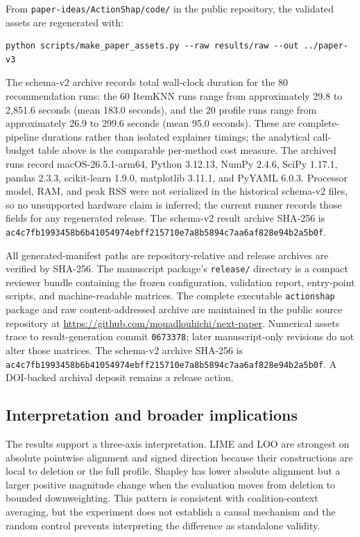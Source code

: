 \documentclass[pdflatex,sn-mathphys-num]{sn-jnl}
\begin{document}
From \texttt{paper-ideas/ActionShap/code/} in the public repository, the validated assets are regenerated with:
\begin{verbatim}
python scripts/make_paper_assets.py --raw results/raw --out ../paper-v3
\end{verbatim}
The schema-v2 archive records total wall-clock duration for the 80 recommendation runs: the 60 ItemKNN runs range from approximately 29.8 to 2,851.6 seconds (mean 183.0 seconds), and the 20 profile runs range from approximately 26.9 to 299.6 seconds (mean 95.0 seconds). These are complete-pipeline durations rather than isolated explainer timings; the analytical call-budget table above is the comparable per-method cost measure. The archived runs record macOS-26.5.1-arm64, Python 3.12.13, NumPy 2.4.6, SciPy 1.17.1, pandas 2.3.3, scikit-learn 1.9.0, matplotlib 3.11.1, and PyYAML 6.0.3. Processor model, RAM, and peak RSS were not serialized in the historical schema-v2 files, so no unsupported hardware claim is inferred; the current runner records those fields for any regenerated release. The schema-v2 result archive SHA-256 is \texttt{ac4c7fb1993458b6b41054974ebff215710e7a8b5894c7aa6af828e94b2a5b0f}.

All generated-manifest paths are repository-relative and release archives are verified by SHA-256. The manuscript package's \texttt{release/} directory is a compact reviewer bundle containing the frozen configuration, validation report, entry-point scripts, and machine-readable matrices. The complete executable \texttt{actionshap} package and raw content-addressed archive are maintained in the public source repository at \url{https://github.com/mouadlouhichi/next-paper}. Numerical assets trace to result-generation commit \texttt{0673378}; later manuscript-only revisions do not alter those matrices. The schema-v2 archive SHA-256 is \texttt{ac4c7fb1993458b6b41054974ebff215710e7a8b5894c7aa6af828e94b2a5b0f}. A DOI-backed archival deposit remains a release action.


\subsection{Interpretation and broader implications}
The results support a three-axis interpretation. LIME and LOO are strongest on absolute pointwise alignment and signed direction because their constructions are local to deletion or the full profile. Shapley has lower absolute alignment but a larger positive magnitude change when the evaluation moves from deletion to bounded downweighting. This pattern is consistent with coalition-context averaging, but the experiment does not establish a causal mechanism and the random control prevents interpreting the difference as standalone validity.
\end{document}
